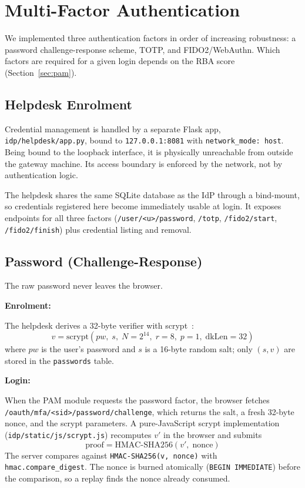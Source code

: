 \section{Multi-Factor Authentication}
\label{sec:mfa}

We implemented three authentication factors in order of increasing
robustness: a password challenge-response scheme, TOTP, and FIDO2/WebAuthn.
Which factors are required for a given login depends on the RBA score
(Section~\ref{sec:pam}).

\subsection{Helpdesk Enrolment}
\label{sec:helpdesk}
Credential management is handled by a separate Flask app,
\texttt{idp/helpdesk/app.py}, bound to \texttt{127.0.0.1:8081} with
\texttt{network\_mode: host}.
Being bound to the loopback interface, it is physically unreachable from
outside the gateway machine. Its access boundary is enforced by the
network, not by authentication logic.

The helpdesk shares the same SQLite database as the IdP through a
bind-mount, so credentials registered here become immediately usable at
login. It exposes endpoints for all three factors
(\texttt{/user/<u>/password}, \texttt{/totp}, \texttt{/fido2/start},
\texttt{/fido2/finish}) plus credential listing and removal.

\subsection{Password (Challenge-Response)}
\label{sec:mfa-pwd}
The raw password never leaves the browser.

\textbf{Enrolment:} 

The helpdesk derives a 32-byte verifier with
scrypt~\cite{rfc7914,percival2009stronger}:
\[
v = \text{scrypt}(\mathit{pw},\; s,\; N=2^{14},\; r=8,\; p=1,\; \text{dkLen}=32)
\]
where $\mathit{pw}$ is the user's password and $s$ is a 16-byte random
salt; only $(s, v)$ are stored in the \texttt{passwords} table.

\textbf{Login:} 

When the PAM module requests the password factor, the
browser fetches \texttt{/oauth/mfa/<sid>/password/challenge}, which returns
the salt, a fresh 32-byte nonce, and the scrypt parameters.
A pure-JavaScript scrypt implementation
(\texttt{idp/static/js/scrypt.js}) recomputes $v'$ in the browser and
submits
\[
\text{proof} = \text{HMAC-SHA256}(v',\; \text{nonce})
\]
The server compares against \texttt{HMAC-SHA256(v, nonce)} with
\texttt{hmac.compare\_digest}.
The nonce is burned atomically (\texttt{BEGIN IMMEDIATE}) before the
comparison, so a replay finds the nonce already consumed.

